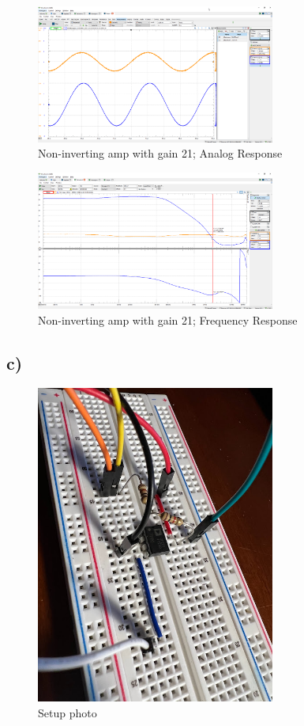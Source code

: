 \documentclass{article}
\begin{document}
	\begin{figure}[H]
	    \centering
	    \includegraphics[width=0.7\textwidth]{2b-1}
	    \caption{Non-inverting amp with gain 21; Analog Response}
	\end{figure}

	\begin{figure}[H]
	    \centering
	    \includegraphics[width=0.7\textwidth]{2b-2}
	    \caption{Non-inverting amp with gain 21; Frequency Response}
	\end{figure}
	
	\subsection*{c)}
	
	\begin{figure}[H]
	    \centering
	    \includegraphics[width=0.7\textwidth]{2c-photo}
	    \caption{Setup photo}
	\end{figure}
	
\end{document}
